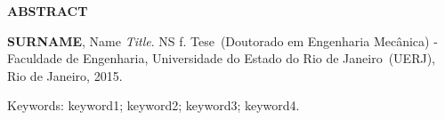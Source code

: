\begin{center}
\textbf{ABSTRACT}
\end{center}


$\!$\\

\hspace{-1.3cm}\textbf{SURNAME}, Name \textit{Title}. NS f. Tese~(Doutorado em Engenharia Mecânica) - Faculdade de Engenharia, Universidade do Estado do Rio de Janeiro~(UERJ), Rio de Janeiro, 2015.

\vspace{.2cm}

\indent \lipsum[1]

\vspace{1cm}

\hspace{-1.3cm}Keywords: keyword1; keyword2; keyword3; keyword4.